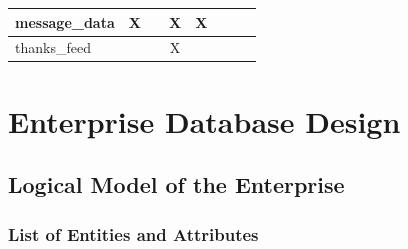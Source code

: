 \documentclass[11pt]{report}
\begin{document}
\begin{table}[h]
{\begin{tabular}{|l|c|cccccc}
message\_data                        & X           & \multicolumn{1}{c|}{}                 & \multicolumn{1}{c|}{X}             & \multicolumn{1}{c|}{X}           & \multicolumn{1}{c|}{}                       & \multicolumn{1}{c|}{}                      & \multicolumn{1}{c|}{}                      \\ \hline
thanks\_feed                         &             & \multicolumn{1}{c|}{}                 & \multicolumn{1}{c|}{X}             & \multicolumn{1}{c|}{}            & \multicolumn{1}{c|}{}                       & \multicolumn{1}{c|}{}                      & \multicolumn{1}{c|}{}                      \\ \hline
\end{tabular}
}
\end{table}
\clearpage

\chapter{Enterprise Database Design}

\section{Logical Model of the Enterprise}
\subsection{List of Entities and Attributes}
\end{document}
